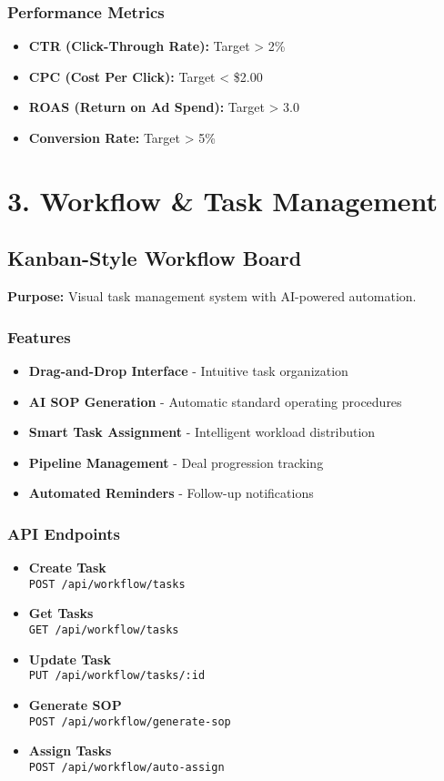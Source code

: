 \documentclass[12pt,a4paper]{article}
\newcommand{\apiendpoint}[2]{\textbf{#1} \\ \texttt{#2}}
\begin{document}
\subsubsection{Performance Metrics}
\begin{itemize}
    \item \textbf{CTR (Click-Through Rate):} Target > 2\%
    \item \textbf{CPC (Cost Per Click):} Target < \$2.00
    \item \textbf{ROAS (Return on Ad Spend):} Target > 3.0
    \item \textbf{Conversion Rate:} Target > 5\%
\end{itemize}

\section{3. Workflow \& Task Management}

\subsection{Kanban-Style Workflow Board}
\textbf{Purpose:} Visual task management system with AI-powered automation.

\subsubsection{Features}
\begin{itemize}
    \item \textbf{Drag-and-Drop Interface} - Intuitive task organization
    \item \textbf{AI SOP Generation} - Automatic standard operating procedures
    \item \textbf{Smart Task Assignment} - Intelligent workload distribution
    \item \textbf{Pipeline Management} - Deal progression tracking
    \item \textbf{Automated Reminders} - Follow-up notifications
\end{itemize}

\subsubsection{API Endpoints}
\begin{itemize}
    \item \apiendpoint{Create Task}{POST /api/workflow/tasks}
    \item \apiendpoint{Get Tasks}{GET /api/workflow/tasks}
    \item \apiendpoint{Update Task}{PUT /api/workflow/tasks/:id}
    \item \apiendpoint{Generate SOP}{POST /api/workflow/generate-sop}
    \item \apiendpoint{Assign Tasks}{POST /api/workflow/auto-assign}
\end{itemize}
\end{document}
